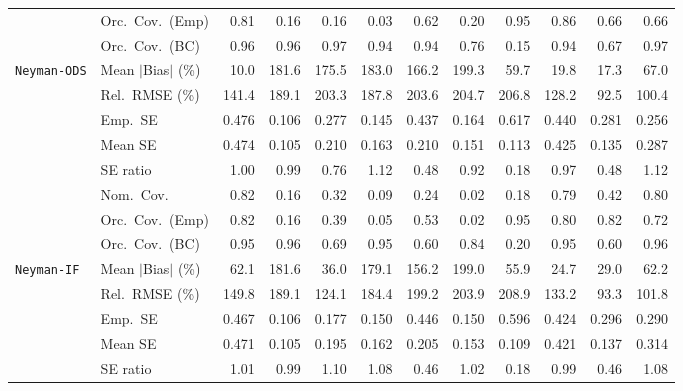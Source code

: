 \begin{landscape}
\begin{longtable}{llrrrrrrrrrr}
 & Orc.\ Cov.\ (Emp) & \cellcolor{rankthree}0.81 & 0.16 & 0.16 & 0.03 & 0.62 & 0.20 & \cellcolor{rankone}0.95 & \cellcolor{ranktwo}0.86 & 0.66 & 0.66 \\
 & Orc.\ Cov.\ (BC) & \cellcolor{rankthree}0.96 & \cellcolor{rankone}0.96 & 0.97 & 0.94 & \cellcolor{ranktwo}0.94 & 0.76 & 0.15 & 0.94 & 0.67 & 0.97 \\
\addlinespace[2pt]
\quad \texttt{Neyman-ODS} & Mean $|$Bias$|$ (\%) & \cellcolor{rankone}10.0 & 181.6 & 175.5 & 183.0 & 166.2 & 199.3 & 59.7 & \cellcolor{rankthree}19.8 & \cellcolor{ranktwo}17.3 & 67.0 \\
 & Rel.\ RMSE (\%) & 141.4 & 189.1 & 203.3 & 187.8 & 203.6 & 204.7 & 206.8 & \cellcolor{rankthree}128.2 & \cellcolor{rankone}92.5 & \cellcolor{ranktwo}100.4 \\
 & Emp.\ SE & 0.476 & 0.106 & 0.277 & 0.145 & 0.437 & 0.164 & 0.617 & 0.440 & 0.281 & 0.256 \\
 & Mean SE & 0.474 & 0.105 & 0.210 & 0.163 & 0.210 & 0.151 & 0.113 & 0.425 & 0.135 & 0.287 \\
 & SE ratio & \cellcolor{rankone}1.00 & \cellcolor{ranktwo}0.99 & 0.76 & 1.12 & 0.48 & 0.92 & 0.18 & \cellcolor{rankthree}0.97 & 0.48 & 1.12 \\
 & Nom.\ Cov. & \cellcolor{rankone}0.82 & 0.16 & 0.32 & 0.09 & 0.24 & 0.02 & 0.18 & \cellcolor{rankthree}0.79 & 0.42 & \cellcolor{ranktwo}0.80 \\
 & Orc.\ Cov.\ (Emp) & \cellcolor{rankthree}0.82 & 0.16 & 0.39 & 0.05 & 0.53 & 0.02 & \cellcolor{rankone}0.95 & 0.80 & \cellcolor{ranktwo}0.82 & 0.72 \\
 & Orc.\ Cov.\ (BC) & \cellcolor{rankthree}0.95 & 0.96 & 0.69 & \cellcolor{rankone}0.95 & 0.60 & 0.84 & 0.20 & \cellcolor{ranktwo}0.95 & 0.60 & 0.96 \\
\addlinespace[2pt]
\quad \texttt{Neyman-IF} & Mean $|$Bias$|$ (\%) & 62.1 & 181.6 & \cellcolor{rankthree}36.0 & 179.1 & 156.2 & 199.0 & 55.9 & \cellcolor{rankone}24.7 & \cellcolor{ranktwo}29.0 & 62.2 \\
 & Rel.\ RMSE (\%) & 149.8 & 189.1 & \cellcolor{rankthree}124.1 & 184.4 & 199.2 & 203.9 & 208.9 & 133.2 & \cellcolor{rankone}93.3 & \cellcolor{ranktwo}101.8 \\
 & Emp.\ SE & 0.467 & 0.106 & 0.177 & 0.150 & 0.446 & 0.150 & 0.596 & 0.424 & 0.296 & 0.290 \\
 & Mean SE & 0.471 & 0.105 & 0.195 & 0.162 & 0.205 & 0.153 & 0.109 & 0.421 & 0.137 & 0.314 \\
 & SE ratio & \cellcolor{ranktwo}1.01 & \cellcolor{rankthree}0.99 & 1.10 & 1.08 & 0.46 & 1.02 & 0.18 & \cellcolor{rankone}0.99 & 0.46 & 1.08 \\

\end{longtable}
\end{landscape}
